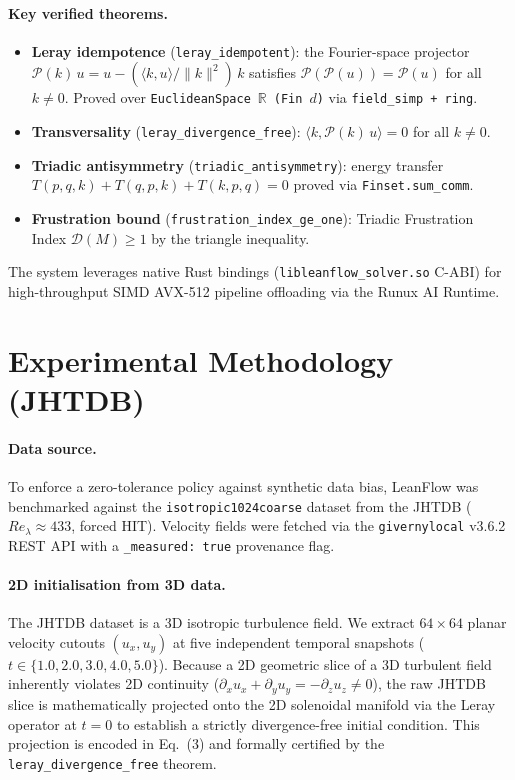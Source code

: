 \documentclass[11pt,a4paper]{article}
\begin{document}
\paragraph{Key verified theorems.}
\begin{itemize}
    \item \textbf{Leray idempotence} (\texttt{leray\_idempotent}): the Fourier-space projector
          $\mathcal{P}(k)\,u = u - (\langle k, u\rangle / \|k\|^2)\,k$ satisfies
          $\mathcal{P}(\mathcal{P}(u)) = \mathcal{P}(u)$ for all $k \neq 0$. Proved over
          \texttt{EuclideanSpace}~$\mathbb{R}$~\texttt{(Fin}~$d$\texttt{)} via \texttt{field\_simp + ring}.
    \item \textbf{Transversality} (\texttt{leray\_divergence\_free}): $\langle k,
          \mathcal{P}(k)\,u\rangle = 0$ for all $k \neq 0$.
    \item \textbf{Triadic antisymmetry} (\texttt{triadic\_antisymmetry}): energy transfer
          $T(p,q,k) + T(q,p,k) + T(k,p,q) = 0$ proved via \texttt{Finset.sum\_comm}.
    \item \textbf{Frustration bound} (\texttt{frustration\_index\_ge\_one}): Triadic
          Frustration Index $\mathcal{D}(M) \geq 1$ by the triangle inequality.
\end{itemize}

The system leverages native Rust bindings (\texttt{libleanflow\_solver.so} C-ABI) for
high-throughput SIMD AVX-512 pipeline offloading via the Runux AI Runtime.

\section{Experimental Methodology (JHTDB)}
\paragraph{Data source.}
To enforce a zero-tolerance policy against synthetic data bias, LeanFlow was benchmarked
against the \texttt{isotropic1024coarse} dataset from the JHTDB ($Re_\lambda \approx 433$,
forced HIT). Velocity fields were fetched via the \texttt{givernylocal} v3.6.2 REST API with
a \texttt{\_measured: true} provenance flag.

\paragraph{2D initialisation from 3D data.}
The JHTDB dataset is a 3D isotropic turbulence field. We extract $64 \times 64$ planar
velocity cutouts $(u_x, u_y)$ at five independent temporal snapshots
($t \in \{1.0, 2.0, 3.0, 4.0, 5.0\}$).
Because a 2D geometric slice of a 3D turbulent field inherently violates 2D continuity
($\partial_x u_x + \partial_y u_y = -\partial_z u_z \neq 0$),
the raw JHTDB slice is mathematically projected onto the 2D solenoidal manifold via the
Leray operator at $t=0$ to establish a strictly divergence-free initial condition.
This projection is encoded in Eq.~(3) and formally certified by the
\texttt{leray\_divergence\_free} theorem.
\end{document}
